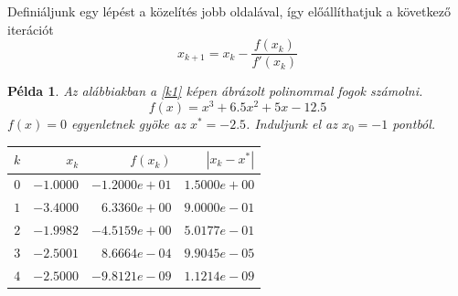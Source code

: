 \documentclass[a4paper,12pt]{report}
\newtheorem{Pl}[Tet]{Példa}
\begin{document}
			Definiáljunk egy lépést a közelítés jobb oldalával, így előállíthatjuk a következő iterációt
			\begin{equation}
				 \label{e2} x_{k+1}=x_k-\frac{f(x_k)}{f'(x_k)}
			\end{equation}
			\begin{Pl}
				Az alábbiakban a \ref{k1} képen ábrázolt polinommal fogok számolni.
				\[f(x)=x^3+6.5x^2+5x-12.5\]
				$f(x)=0$ egyenletnek gyöke az $x^*=-2.5$. Induljunk el az $x_0=-1$ pontból.
                \begin{center}				
                  \begin{tabular}{|r|r|r|r|}
                      \hline
                      $k$ & $x_k$     & $f(x_k)$      & $|x_k-x^*|$  \\ \hline
                      $0$ & $-1.0000$ & $-1.2000e+01$ & $1.5000e+00$ \\ 
                      $1$ & $-3.4000$ & $6.3360e+00$  & $9.0000e-01$ \\ 
                      $2$ & $-1.9982$ & $-4.5159e+00$ & $5.0177e-01$ \\ 
                      $3$ & $-2.5001$ & $8.6664e-04$  & $9.9045e-05$ \\ 
                      $4$ & $-2.5000$ & $-9.8121e-09$ & $1.1214e-09$ \\
                      \hline
                  \end{tabular}
				\end{center}
            \end{Pl}
            
    	
            
        
        
\end{document}
